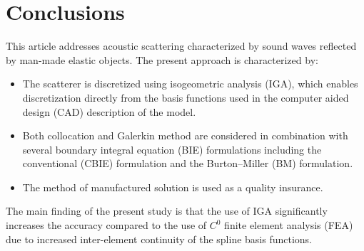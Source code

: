 \section{Conclusions}
\label{Sec3:conclusions}
This article addresses acoustic scattering characterized by sound waves reflected by man-made elastic objects. The present approach is characterized by:
\begin{itemize}
	\item The scatterer is discretized using isogeometric analysis (IGA), which enables discretization directly from the basis functions used in the computer aided design (CAD) description of the model.
	\item Both collocation and Galerkin method are considered in combination with several boundary integral equation (BIE) formulations including the conventional (CBIE) formulation and the Burton--Miller (BM) formulation.
	\item The method of manufactured solution is used as a quality insurance.
\end{itemize}

The main finding of the present study is that the use of IGA significantly increases the accuracy compared to the use of $C^0$ finite element analysis (FEA) due to increased inter-element continuity of the spline basis functions.

